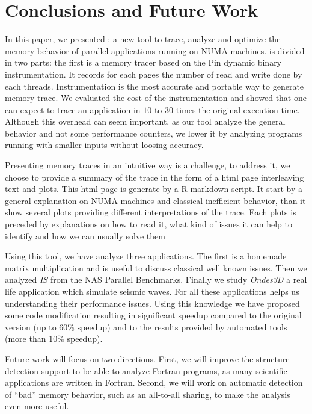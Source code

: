 
\section{Conclusions and Future Work}
\label{sec:concl}

In this paper, we presented \TABARNAC: a new tool to trace, analyze and
optimize the memory behavior of parallel applications running on NUMA
machines. \TABARNAC is divided in two parts: the first is a memory tracer
based on the Pin dynamic binary instrumentation. It records for each pages the
number of read and write done by each threads. Instrumentation is the most
accurate and portable way to generate memory trace. We evaluated the cost of
the instrumentation and showed that one can expect to trace an application in
$10$ to $30$ times the original execution time.
Although this overhead can seem important, as our tool analyze the general
behavior and not some performance counters, we lower it by analyzing programs
running with smaller inputs without loosing accuracy.

Presenting memory traces in an intuitive way is a challenge, to address it, we
choose to provide a summary of the trace in the form of a html page
interleaving text and plots. This html page is generate by a R-markdown
script. It start by a general explanation on NUMA machines and classical
inefficient behavior, than it show several plots providing different
interpretations of the trace. Each plots is preceded by explanations on how to
read it, what kind of issues it can help to identify and how we can usually
solve them

Using this tool, we have analyze three applications. The first is a homemade
matrix multiplication and is useful to discuss classical well known issues.
Then we analyzed \emph{IS} from the NAS Parallel Benchmarks. Finally we study
\emph{Ondes3D} a real life application which simulate seismic waves. For all
these applications \TABARNAC helps us understanding their performance issues.
Using this knowledge we have proposed some code modification resulting in
significant speedup compared to the original version (up to $60\%$ speedup)
and to the results provided by automated tools (more than $10\%$ speedup).

Future work will focus on two directions. First, we will improve the
structure detection support to be able to analyze Fortran programs, as many
scientific applications are written in Fortran. Second, we will work
on automatic detection of ``bad'' memory behavior, such as an all-to-all sharing,
to make the analysis even more useful.

